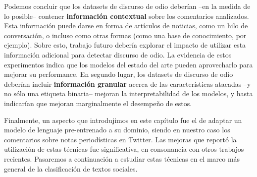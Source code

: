 Podemos concluir que los datasets de discurso de odio deberían --en la medida de lo posible-- contener \textbf{información contextual} sobre los comentarios analizados. Esta información puede darse en forma de artículos de noticias, como un hilo de conversación, o incluso como otras formas (como una base de conocimiento, por ejemplo). Sobre esto, trabajo futuro debería explorar el impacto de utilizar esta información adicional para detectar discurso de odio. La evidencia de estos experimentos indica que los modelos del estado del arte pueden aprovecharlo para mejorar su performance. En segundo lugar, los datasets de discurso de odio deberían incluir \textbf{información granular} acerca de las características atacadas --y no sólo una etiqueta binaria-- mejoran la interpretabilidad de los modelos, y hasta indicarían que mejoran marginalmente el desempeño de estos.

Finalmente, un aspecto que introdujimos en este capítulo fue el de adaptar un modelo de lenguaje pre-entrenado a su dominio, siendo en nuestro caso los comentarios sobre notas periodísticas en Twitter. Las mejoras que reportó la utilización de estas técnicas fue significativa, en consonancia con otros trabajos recientes. Pasaremos a continuación a estudiar estas técnicas en el marco más general de la clasificación de textos sociales.